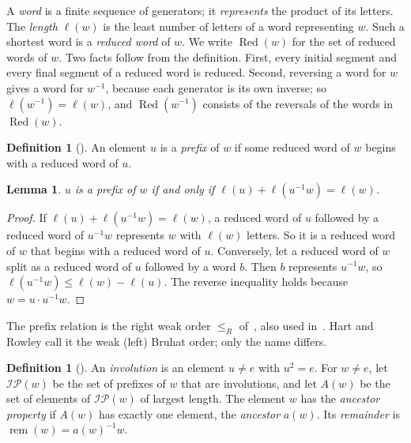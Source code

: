 \documentclass[11pt]{amsart}
\newtheorem{lemma}[theorem]{Lemma}
\theoremstyle{definition}\newtheorem{definition}[theorem]{Definition}
\theoremstyle{remark}\newtheorem{remark}[theorem]{Remark}
\newcommand{\IP}{\mathcal{IP}}
\DeclareMathOperator{\rem}{rem}
\DeclareMathOperator{\Red}{Red}
\begin{document}
A \emph{word} is a finite sequence of generators; it \emph{represents} the product of its letters. The \emph{length} \(\ell(w)\) is the least number of letters of a word representing \(w\). Such a shortest word is a \emph{reduced word} of \(w\). We write \(\Red(w)\) for the set of reduced words of \(w\). Two facts follow from the definition. First, every initial segment and every final segment of a reduced word is reduced. Second, reversing a word for \(w\) gives a word for \(w^{-1}\), because each generator is its own inverse; so \(\ell(w^{-1})=\ell(w)\), and \(\Red(w^{-1})\) consists of the reversals of the words in \(\Red(w)\).

\begin{definition}[{\cite[\S1]{HR}}]
An element \(u\) is a \emph{prefix} of \(w\) if some reduced word of \(w\) begins with a reduced word of \(u\).
\end{definition}

\begin{lemma}\label{lem:prefix}
\(u\) is a prefix of \(w\) if and only if \(\ell(u)+\ell(u^{-1}w)=\ell(w)\).
\end{lemma}

\begin{proof}
If \(\ell(u)+\ell(u^{-1}w)=\ell(w)\), a reduced word of \(u\) followed by a reduced word of \(u^{-1}w\) represents \(w\) with \(\ell(w)\) letters. So it is a reduced word of \(w\) that begins with a reduced word of \(u\). Conversely, let a reduced word of \(w\) split as a reduced word of \(u\) followed by a word \(b\). Then \(b\) represents \(u^{-1}w\), so \(\ell(u^{-1}w)\le\ell(w)-\ell(u)\). The reverse inequality holds because \(w=u\cdot u^{-1}w\).
\end{proof}

The prefix relation is the right weak order \(\le_R\) of~\cite[\S3.1]{BB}, also used in~\cite{GG}. Hart and Rowley call it the weak (left) Bruhat order; only the name differs.

\begin{definition}[{\cite[\S1]{HR}}]\label{def:ancestor}
An \emph{involution} is an element \(u\neq e\) with \(u^2=e\). For \(w\neq e\), let \(\IP(w)\) be the set of prefixes of \(w\) that are involutions, and let \(A(w)\) be the set of elements of \(\IP(w)\) of largest length. The element \(w\) has the \emph{ancestor property} if \(A(w)\) has exactly one element, the \emph{ancestor} \(a(w)\). Its \emph{remainder} is \(\rem(w)=a(w)^{-1}w\).
\end{definition}
\end{document}
